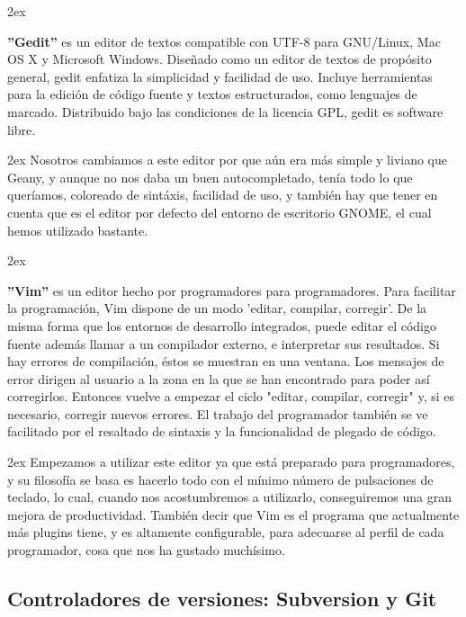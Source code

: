 \documentclass[12pt,a4paper]{report}
\begin{document}
\parskip 2ex

\textbf{''Gedit''} es un editor de textos compatible con UTF-8 para GNU/Linux,
Mac OS X y Microsoft Windows. Diseñado como un editor de textos de propósito
general, gedit enfatiza la simplicidad y facilidad de uso. Incluye herramientas
para la edición de código fuente y textos estructurados, como lenguajes de
marcado. Distribuido bajo las condiciones de la licencia GPL, gedit es software
libre. 

\parskip 2ex
Nosotros cambiamos a este editor por que aún era más simple y liviano que Geany,
y aunque no nos daba un buen autocompletado, tenía todo lo que queríamos,
coloreado de sintáxis, facilidad de uso, y también hay que tener en cuenta que
es el editor por defecto del entorno de escritorio GNOME, el cual hemos
utilizado bastante. 

\parskip 2ex

\textbf{''Vim''} es un editor hecho por programadores para programadores. Para
facilitar la programación, Vim dispone de un modo 'editar, compilar, corregir'.
De la misma forma que los entornos de desarrollo integrados, puede editar el
código fuente además llamar a un compilador externo, e interpretar sus
resultados. Si hay errores de compilación, éstos se muestran en una ventana. Los
mensajes de error dirigen al usuario a la zona en la que se han encontrado para
poder así corregirlos. Entonces vuelve a empezar el ciclo "editar, compilar,
corregir" y, si es necesario, corregir nuevos errores. El trabajo del
programador también se ve facilitado por el resaltado de sintaxis y la
funcionalidad de plegado de código.

\parskip 2ex Empezamos a utilizar este editor ya que está preparado para
programadores, y su filosofía se basa es hacerlo todo con el mínimo número de
pulsaciones de teclado, lo cual, cuando nos acostumbremos a utilizarlo,
conseguiremos una gran mejora de productividad. También decir que Vim es el
programa que actualmente más plugins tiene, y es altamente configurable, para
adecuarse al perfil de cada programador, cosa que nos ha gustado muchísimo. 


\subsection{Controladores de versiones: Subversion y Git}
\end{document}
